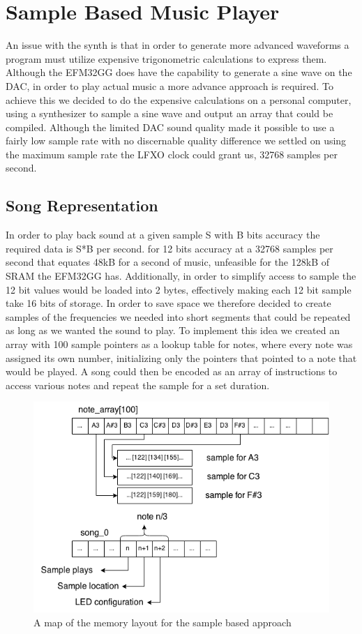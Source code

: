\section{Sample Based Music Player}
An issue with the synth is that in order to generate more advanced waveforms a program must utilize expensive trigonometric calculations to express them. Although the EFM32GG does have the capability to generate a sine wave on the DAC, in order to play actual music a more advance approach is required. To achieve this we decided to do the expensive calculations on a personal computer, using a synthesizer to sample a sine wave and output an array that could be compiled. Although the limited DAC sound quality made it possible to use a fairly low sample rate with no discernable quality difference we settled on using the maximum sample rate the LFXO clock could grant us, 32768 samples per second. 

\subsection{Song Representation}
In order to play back sound at a given sample S with B bits accuracy the required data is S*B per second. for 12 bits accuracy at a 32768 samples per second that equates 48kB for a second of music, unfeasible for the 128kB of SRAM the EFM32GG has. Additionally, in order to simplify access to sample the 12 bit values would be loaded into 2 bytes, effectively making each 12 bit sample take 16 bits of storage. In order to save space we therefore decided to create samples of the frequencies we needed into short segments that could be repeated as long as we wanted the sound to play. To implement this idea we created an array with 100 sample pointers as a lookup table for notes, where every note was assigned its own number, initializing only the pointers that pointed to a note that would be played. A song could then be encoded as an array of instructions to access various notes and repeat the sample for a set duration.


\begin{figure}[ht]
  \centering
  \includegraphics[width=\textwidth]{images/sample_array_layout.png}
  \caption{A map of the memory layout for the sample based approach}\label{fig:array_layout}
\end{figure}

